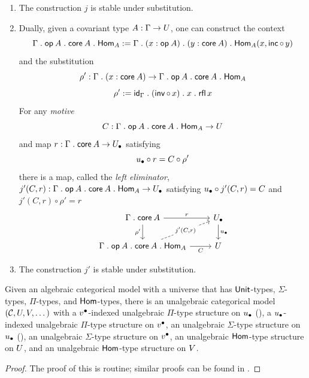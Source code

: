\begin{definition}
\begin{enumerate}
\[\begin{tikzcd}
	   \arrow["{j(C,r)}"{description}, dashed, from=2-1, to=1-2]
	   \arrow["C"', from=2-1, to=2-2]
    \end{tikzcd}\]
  \item The construction $j$ is stable under substitution.
  \item
    Dually, given a covariant type $A : \Gamma \to U$,
    one can construct the context 
    \[\Gamma \mathrel{.} \mathop{\mathsf{op}_{}} A \mathrel{.} \mathop{\mathsf{core}_{}} A \mathrel{.} \mathsf{Hom}_A :=
    \Gamma \mathrel{.} (x : \mathop{\mathsf{op}_{}} A) \mathrel{.} (y : \mathop{\mathsf{core}_{}} A) \mathrel{.} \mathsf{Hom}_A(x,\mathop{\mathsf{inc}} \circ \, y)\]
    and the substitution
    \[\rho' : \Gamma \mathrel{.} (x : \mathop{\mathsf{core}_{}} A) \to \Gamma \mathrel{.} \mathop{\mathsf{op}_{}} A \mathrel{.} \mathop{\mathsf{core}_{}} A \mathrel{.} \mathsf{Hom}_A\]
    \[\rho' := \mathsf{id}_{\Gamma} \mathrel{.} (\mathop{\mathsf{inv}} \circ \, x) \mathrel{.} x \mathrel{.} \mathop{\mathsf{rfl}} x\]
    For any \emph{motive} \[C : \Gamma \mathrel{.} \mathop{\mathsf{op}_{}} A \mathrel{.} \mathop{\mathsf{core}_{}} A \mathrel{.} \mathsf{Hom}_A \to U\]
    and map $r : \Gamma \mathrel{.} \mathop{\mathsf{core}_{}} A \to {U_\bullet}$ satisfying
    \[ {u_\bullet} \circ r = C \circ \rho' \]
    there is a map, called the \emph{left eliminator},
    $j' (C, r) : \Gamma \mathrel{.} \mathop{\mathsf{op}_{}} A \mathrel{.} \mathop{\mathsf{core}_{}} A \mathrel{.} \mathsf{Hom}_A \to {U_\bullet}$
    satisfying ${u_\bullet} \circ j'(C,r) = C$ and
    $j' (C, r) \circ \rho'  = r$
    \[\begin{tikzcd}
	   \Gamma \opext \vCore A & \Ulow \\
	   {\Gamma \opext \vOp A \opext \vCore A \opext \Hom_A} & \U
	   \arrow["{r}", from=1-1, to=1-2]
	   \arrow["{\rho'}"', from=1-1, to=2-1]
	   \arrow["\ulow", from=1-2, to=2-2]
	   \arrow["{j'(C,r)}"{description}, dashed, from=2-1, to=1-2]
	   \arrow["C"', from=2-1, to=2-2]
    \end{tikzcd}\]
  \item The construction $j'$ is stable under substitution.
  \end{enumerate}
\end{definition}

\begin{theorem}
  Given an algebraic categorical model with a universe that has
  $\mathsf{Unit}$-types, $\Sigma$-types, $\Pi$-types, and $\mathsf{Hom}$-types,
  there is an unalgebraic categorical model $(\mathcal{C},U,V,\dots)$
  with a ${v^\bullet}$-indexed {unalgebraic $\Pi$-type structure} on ${u_\bullet}$ (),
  a ${u_\bullet}$-indexed {unalgebraic $\Pi$-type structure} on ${v^\bullet}$,
  an {unalgebraic $\Sigma$-type structure} on ${u_\bullet}$ (),
  an {unalgebraic $\Sigma$-type structure} on ${v^\bullet}$,
  an {unalgebraic $\mathsf{Hom}$-type structure} on $U$,
  and an {unalgebraic $\mathsf{Hom}$-type structure} on $V$.
\end{theorem}
\begin{proof}
  The proof of this is routine;
  similar proofs can be found in \cite{awodey2018,awodey2025,hua2026}.
\end{proof}


